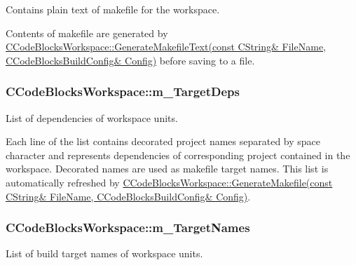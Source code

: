 Contains plain text of makefile for the workspace. 

Contents of makefile are generated by \hyperlink{classCCodeBlocksWorkspace_aef881aafe1c5e43a56ffdcff6b8d8b8d}{C\-Code\-Blocks\-Workspace\-::\-Generate\-Makefile\-Text(const C\-String\& File\-Name, C\-Code\-Blocks\-Build\-Config\& Config)} before saving to a file. \hypertarget{classCCodeBlocksWorkspace_a5e1d4659d90551a37aa3f9f2254dff34}{
\subsubsection[{m\-\_\-\-Target\-Deps}]{\setlength{\rightskip}{0pt plus 5cm}C\-Code\-Blocks\-Workspace\-::m\-\_\-\-Target\-Deps\hspace{0.3cm}{\ttfamily [private]}}}\label{classCCodeBlocksWorkspace_a5e1d4659d90551a37aa3f9f2254dff34}


List of dependencies of workspace units. 

Each line of the list contains decorated project names separated by space character and represents dependencies of corresponding project contained in the workspace. Decorated names are used as makefile target names. This list is automatically refreshed by \hyperlink{classCCodeBlocksWorkspace_a2057d5876c3e450b04295066dcaef035}{C\-Code\-Blocks\-Workspace\-::\-Generate\-Makefile(const C\-String\& File\-Name, C\-Code\-Blocks\-Build\-Config\& Config)}. \hypertarget{classCCodeBlocksWorkspace_aad71e4af12c3f47eea577bef49a71433}{
\subsubsection[{m\-\_\-\-Target\-Names}]{\setlength{\rightskip}{0pt plus 5cm}C\-Code\-Blocks\-Workspace\-::m\-\_\-\-Target\-Names\hspace{0.3cm}{\ttfamily [private]}}}\label{classCCodeBlocksWorkspace_aad71e4af12c3f47eea577bef49a71433}


List of build target names of workspace units. 

